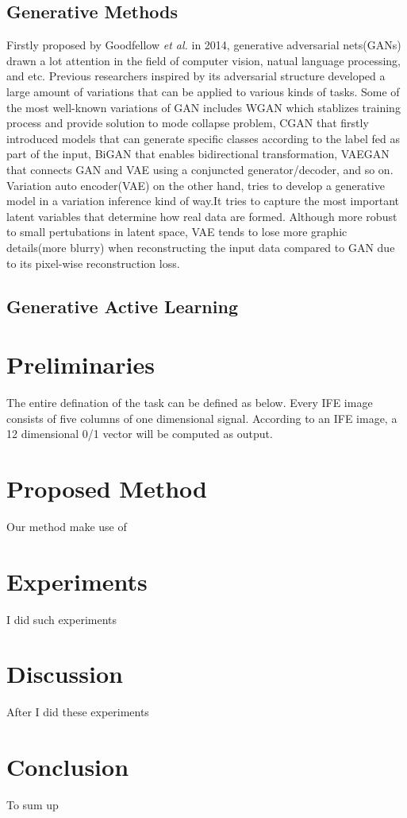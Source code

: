 \documentclass[letterpaper]{article}
\begin{document}
\subsection{Generative Methods}
Firstly proposed by Goodfellow \emph{et al.} in 2014, generative adversarial nets(GANs) \cite{goodfellow2014generative} drawn a lot attention in the field of computer vision, natual language processing, and etc. Previous researchers inspired by its adversarial structure developed a large amount of variations that can be applied to various kinds of tasks. Some of the most well-known variations of GAN includes WGAN\cite{arjovsky2017wasserstein} which stablizes training process and provide solution to mode collapse problem, CGAN\cite{mirza2014conditional} that firstly introduced models that can generate specific classes according to the label fed as part of the input, BiGAN\cite{donahue2016adversarial} that enables bidirectional transformation, VAEGAN\cite{larsen2015autoencoding} that connects GAN and VAE using a conjuncted generator/decoder, and so on. Variation auto encoder(VAE) on the other hand, tries to develop a generative model in a variation inference kind of way\cite{kingma2013auto}.It tries to capture the most important latent variables that determine how real data are formed. Although more robust to small pertubations in latent space, VAE tends to lose more graphic details(more blurry) when reconstructing the input data compared to GAN due to its pixel-wise reconstruction loss. 
\subsection{Generative Active Learning}

\section{Preliminaries}
The entire defination of the task can be defined as below. Every IFE image consists of five columns of one dimensional signal. According to an IFE image, a 12 dimensional 0/1 vector will be computed as output.

\section{Proposed Method}
Our method make use of

\section{Experiments}
I did such experiments

\section{Discussion}
After I did these experiments

\section{Conclusion}
To sum up



\end{document}

